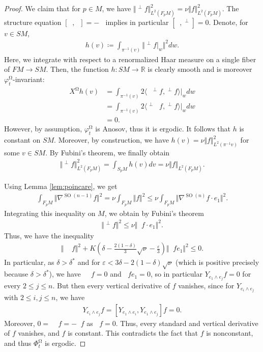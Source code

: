\documentclass[12pt]{amsart}
\numberwithin{numbering}{section}
\theoremstyle{plain}
\theoremstyle{definition}
\theoremstyle{remark}
\numberwithin{equation}{section}
\DeclareMathOperator{\SO}{SO}
\DeclareMathOperator{\nv}{\nabla_{\mathbb{V}}}
\DeclareMathOperator{\nhs}{\nabla_{\mathbb{H}^{\mg}}}
\DeclareMathOperator{\xs}{\mathbb{X}^{\mg}}
\DeclareMathOperator{\mg}{\Omega}
\newcommand{\R}{\mathbb{R}}
\begin{document}
\begin{proof}
We claim that for $p \in M$, we have $\Vert \nv^\perp f \Vert^2_{L^2(F_p M)} = \nu \Vert f \Vert^2_{L^2(F_pM)}$. The structure equation $[\xs, \nv] = - \nhs$ implies in particular $[\xs, \nv^\perp] = 0$. Denote, for $v \in SM$,
\begin{align*}
h(v) \coloneq \int_{\pi^{-1}(v)} \Vert \nv^\perp f \vert_w \Vert^2 dw.
\end{align*}
Here, we integrate with respect to a renormalized Haar measure on a single fiber of $FM \to SM$. Then, the function $h: SM \to \R$ is clearly smooth and is moreover $\varphi_t^{\mg}$-invariant:
\begin{align*}
X^{\mg} h(v) &= \int_{\pi^{-1}(v)} 2 \langle \xs \nv^\perp f, \nv^\perp f \rangle \vert_w dw \\ 
&= \int_{\pi^{-1}(v)} 2 \langle \nv^\perp \xs f, \nv^\perp f \rangle \vert_w dw \\ 
&= 0.
\end{align*}
However, by assumption, $\varphi_t^{\mg}$ is Anosov, thus it is ergodic. It follows that $h$ is constant on $SM$. Moreover, by construction, we have $h(v) = \nu \Vert f \Vert^2_{L^2(\pi^{-1} v)}$ for some $v \in SM$. By Fubini's theorem, we finally obtain 
\begin{align*}
\Vert \nv^\perp f \Vert^2_{L^2(F_p M)} = \int_{S_p M} h(v) dv = \nu \Vert f \Vert_{L^2(F_p M)}.
\end{align*}

\medskip

Using Lemma \ref{lem:poincare}, we get
\begin{align*} 
\int_{F_p M} \Vert \nabla^{\SO(n-1)} f \Vert^2
= \nu \int_{F_p M} \Vert f \Vert^2
\leq \nu \int_{F_p M} \Vert \nabla^{\SO(n)} f \cdot e_1 \Vert^2. 
\end{align*}
Integrating this inequality on $M$, we obtain by Fubini's theorem
\begin{align*}
\Vert \nv^\perp f \Vert^2 \leq \nu \Vert \nv f \cdot e_1 \Vert^2.
\end{align*}
Thus, we have the inequality
\begin{align*}
\Vert \xs \nv f \Vert^2 + K \left ( \delta - \frac{2(1-\delta)}{3}\sqrt{\nu} - \frac{\varepsilon}{3} \right ) \Vert \nv f e_1 \Vert^2 \leq 0.
\end{align*}
In particular, as $\delta > \delta^*$ and for $\varepsilon < 3 \delta - 2(1-\delta)\sqrt{\nu}$ (which is positive precisely because $\delta > \delta^*$), we have $\xs \nv f = 0$ and $\nv f e_1 = 0$, so in particular $Y_{e_1 \wedge e_j} f = 0$ for every $2 \leq j \leq n$. But then every vertical derivative of $f$ vanishes, since for $Y_{e_i \wedge e_j}$ with $2 \leq i, j \leq n$, we have 
\begin{align*}
Y_{e_i \wedge e_j} f = [Y_{e_1 \wedge e_i}, Y_{e_1 \wedge e_j}] f = 0.
\end{align*}
Moreover, $0 = \xs \nv f = - \nhs f$ as $\xs f = 0$. Thus, every standard and vertical derivative of $f$ vanishes, and $f$ is constant. This contradicts the fact that $f$ is nonconstant, and thus $\Phi^{\mg}_t$ is ergodic.
\end{proof}
\end{document}
